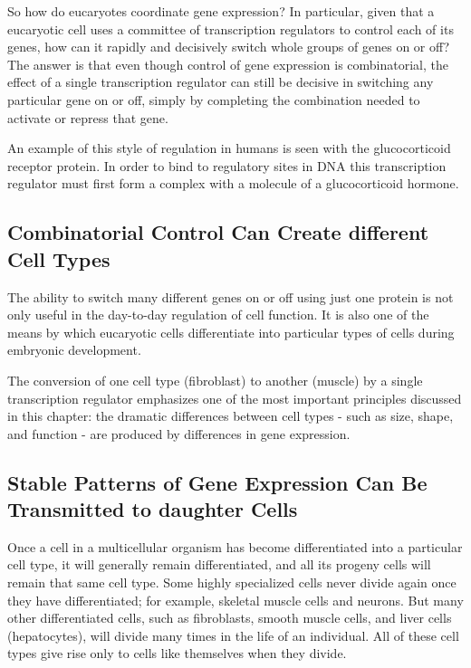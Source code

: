 So how do eucaryotes coordinate gene expression? In particular, given that a eucaryotic
cell uses a committee of transcription regulators to control each of its genes,
how can it rapidly and decisively
switch whole groups of genes on or off? The answer is that even though
control of gene expression is combinatorial, the effect of a single transcription
regulator can still be decisive in switching any particular gene
on or off, simply by completing the combination needed to activate or
repress that gene.

An example of this style of regulation in humans is seen with the glucocorticoid
receptor protein. In order to bind to regulatory sites in DNA
this transcription regulator must first form a complex with a molecule
of a glucocorticoid hormone.

\subsection{Combinatorial Control Can Create different Cell Types}

The ability to switch many different genes on or off using just one protein
is not only useful in the day-to-day regulation of cell function. It is also
one of the means by which eucaryotic cells differentiate into particular
types of cells during embryonic development.

The conversion of one cell type (fibroblast) to another (muscle) by a single
transcription regulator emphasizes one of the most important principles
discussed in this chapter: the dramatic differences between cell types -
such as size, shape, and function - are produced by differences in gene
expression.

\subsection{Stable Patterns of Gene Expression Can Be Transmitted to daughter Cells}

Once a cell in a multicellular organism has become differentiated into a particular cell type, it will generally
remain differentiated, and all its progeny cells will remain that same cell
type. Some highly specialized cells never divide again once they have
differentiated; for example, skeletal muscle cells and neurons. But many
other differentiated cells, such as fibroblasts, smooth muscle cells, and
liver cells (hepatocytes), will divide many times in the life of an individual.
All of these cell types give rise only to cells like themselves when
they divide.

